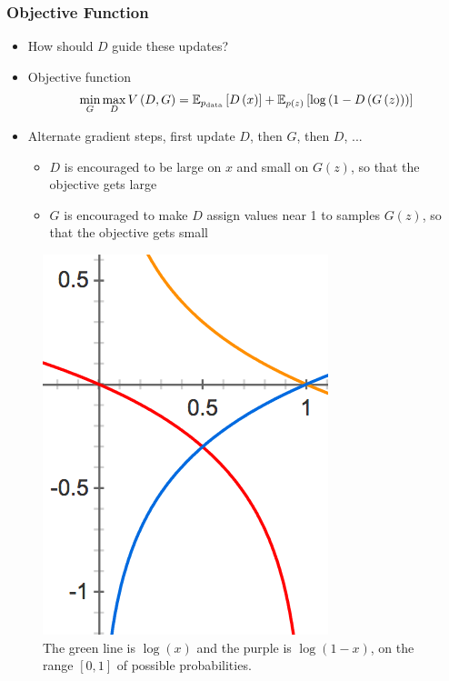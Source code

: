 \documentclass[10pt,mathserif]{beamer}
\begin{document}
\begin{frame}
\frametitle{Objective Function}
 \begin{itemize}
   \item How should $D$ guide these updates?
   \item Objective function
     \begin{align*}
       \min_{G}\max_{D} V\left(D, G\right) = \mathbb{E}_{p_{\text{data}}}\left[{D\left(x\right)}\right] + \mathbb{E}_{p\left(z\right)}\left[{\log\left(1 - D\left(G\left(z\right)\right)\right)}\right]
     \end{align*}
   \item Alternate gradient steps, first update $D$, then $G$, then $D$, ...
\begin{itemize}
\item $D$ is encouraged to be large on $x$ and small on $G\left(z\right)$, so
  that the objective gets large
\item $G$ is encouraged to make $D$ assign values near 1 to samples $G\left(z\right)$, so that the objective gets small
\end{itemize}
 \end{itemize}
\begin{figure}[ht]
  \centering
  \includegraphics[width=0.7\paperwidth]{figure/gan_objectives}
  \caption{The green line is $\log\left(x\right)$ and the purple is $\log\left(1
    - x\right)$, on the range $\left[0, 1\right]$ of possible
    probabilities. \label{fig:gan_objectives} }
\end{figure}
\end{frame}
\end{document}
